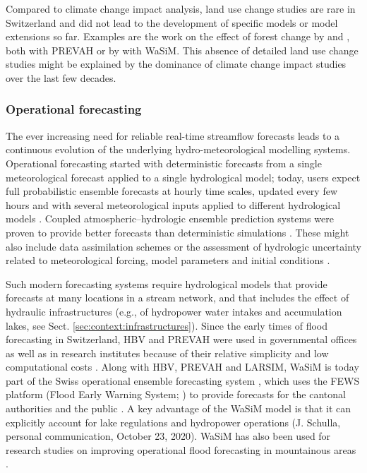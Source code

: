 \documentclass[10pt,a4paper]{article}
\begin{document}
Compared to climate change impact analysis, land use change studies are rare in Switzerland and did not lead to the development of specific models or model extensions so far. Examples are the work on the effect of forest change by \citet{Koplin2013} and \citet{Schattan2013}, both with PREVAH or by \citet{Alaoui2014} with WaSiM. This absence of detailed land use change studies might be explained by the dominance of climate change impact studies over the last few decades. 


\subsubsection{Operational forecasting}
\label{sec:context:forecasting}

The ever increasing need for reliable real-time streamflow forecasts leads to a continuous evolution of the underlying hydro-meteorological modelling systems. Operational forecasting started with deterministic forecasts from a single meteorological forecast applied to a single hydrological model; today, users expect full probabilistic ensemble forecasts at hourly time scales, updated every few hours and with several meteorological inputs applied to different hydrological models \citep{Jasper2016}. Coupled atmospheric--hydrologic ensemble prediction systems were proven to provide better forecasts than deterministic simulations \citep{Verbunt2007, Zappa2008, Jaun2008, Liechti2013}. These might also include data assimilation schemes \citep{JorgHess2015a} or the assessment of hydrologic uncertainty related to meteorological forcing, model parameters and initial conditions \citep{Jaun2009, Zappa2011a, Fundel2011}.

Such modern forecasting systems require hydrological models that provide forecasts at many locations in a stream network, and that includes the effect of hydraulic infrastructures (e.g., of hydropower water intakes and accumulation lakes, see Sect. \ref{sec:context:infrastructures}). Since the early times of flood forecasting in Switzerland, HBV and PREVAH were used in governmental offices \citep{Jasper2016} as well as in research institutes because of their relative simplicity and low computational costs \citep{Verbunt2006, Addor2011, Murphy2019, Antonetti2019}. Along with HBV, PREVAH and LARSIM, WaSiM is today part of the Swiss operational ensemble forecasting system \citep{Jasper2016}, which uses the FEWS platform (Flood Early Warning System; \citealp{Werner2013}) to provide forecasts for the cantonal authorities and the public \citep{FOEN2019}. A key advantage of the WaSiM model is that it can explicitly account for lake regulations and hydropower operations (J. Schulla, personal communication, October 23, 2020). WaSiM has also been used for research studies on improving operational flood forecasting in mountainous areas \citep{Jasper2002, Jasper2003, Ahrens2003a, Ahrens2003b}.
\end{document}
